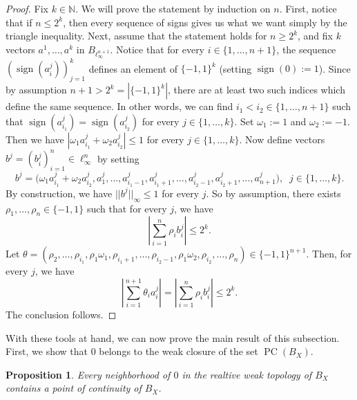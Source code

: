 \documentclass[11pt,a4paper,reqno]{amsart}
\numberwithin{equation}{section}
\newcommand{\abs}[1]{\left\lvert#1\right\rvert}
\newcommand{\N}{\mathbb{N}}
\DeclareMathOperator{\sign}{sign}
\DeclareMathOperator{\PC}{PC}
\newcommand{\1}{\mathbbm{1}}
\renewcommand{\geq}{\geqslant}
\renewcommand{\leq}{\leqslant}
\theoremstyle{plain}
\newtheorem{proposition}[theorem]{Proposition}
\theoremstyle{definition}
\begin{document}
\begin{proof}
        Fix $k\in\N$. We will prove the statement by induction on $n$. First, notice that if $n\leq2^k$, then every sequence of signs gives us what we want simply by the triangle inequality. Next, assume that the statement holds for $n\geq 2^k$, and fix $k$ vectors $a^1,\dots, a^k$ in $B_{\ell_{\infty}^{n+1}}$. Notice that for every $i\in\{1,\dots, n+1\}$, the sequence $(\sign(a_i^j))_{j=1}^k$ defines an element of $\{-1,1\}^k$ (setting $\sign(0):=1$). Since by assumption $n+1>2^k=\abs{\{-1,1\}^k}$, there are at least two such indices which define the same sequence. In other words, we can find $i_1<i_2\in\{1,\dots,n+1\}$ such that $\sign(a^j_{i_1})=\sign(a^j_{i_2})$ for every $j\in\{1,\dots,k\}$. Set $\omega_1:=1$ and $\omega_2:=-1$. Then we have $|\omega_1a^j_{i_1}+\omega_2a^j_{i_2}|\leq 1$ for every $j\in\{1,\dots,k\}$. Now define vectors $b^j=(b^j_i)_{i=1}^{n}\in\ell_{\infty}^n$ by setting 
       \begin{equation*}
        b^j =\big(\omega_1a^j_{i_1}+\omega_2a^j_{i_2},a^j_1,\dots,a^j_{i_1-1},a^j_{i_1+1},\dots,a^j_{i_2-1},a^j_{i_2+1},\dots,a^j_{n+1}\big),\;\; j\in\{1,\dots,k\}.
        \end{equation*}
        By construction, we have $||b^{j}||_{\infty}\leq 1$ for every $j$. So by assumption, there exists $\rho_1,\dots,\rho_n\in\{-1,1\}$ such that for every $j$, we have \begin{equation*}
        \abs{\sum_{i=1}^n\rho_ib^j_i}\leq 2^k.
        \end{equation*}
       Let $\theta=(\rho_2,\dots,\rho_{i_1},\rho_1\omega_1,\rho_{i_1+1},\dots,\rho_{i_2-1},\rho_1\omega_2,\rho_{i_2},\dots,\rho_n)\in\{-1,1\}^{n+1}$. Then, for every $j$, we have \begin{equation*}  
        \abs{\sum_{i=1}^{n+1}\theta_i a^j_i}=\abs{\sum_{i=1}^n\rho_ib^j_i}\leq 2^k.
       \end{equation*} The conclusion follows.
    \end{proof} 

With these tools at hand, we can now prove the main result of this subsection. First, we show that $0$ belongs to the weak closure of the set $\PC(B_X)$. 
    
\begin{proposition}\label{prop:prop:0_in_weak_closure_of_set_of_points_of_continuity}
 Every neighborhood of $0$ in the realtive weak topology of $B_X$ contains a point of continuity of $B_X$.
\end{proposition}
\end{document}
